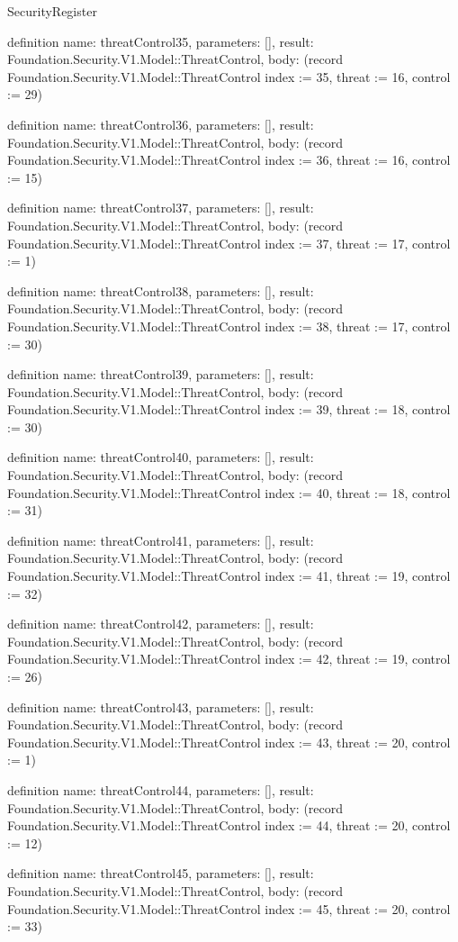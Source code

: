 \begin{lexlean}{SecurityRegister}
\begin{semanticmodule}
definition{
  name: threatControl35,
  parameters: [],
  result: Foundation.Security.V1.Model::ThreatControl,
  body: (record Foundation.Security.V1.Model::ThreatControl {index := 35, threat := 16, control := 29})
}

definition{
  name: threatControl36,
  parameters: [],
  result: Foundation.Security.V1.Model::ThreatControl,
  body: (record Foundation.Security.V1.Model::ThreatControl {index := 36, threat := 16, control := 15})
}

definition{
  name: threatControl37,
  parameters: [],
  result: Foundation.Security.V1.Model::ThreatControl,
  body: (record Foundation.Security.V1.Model::ThreatControl {index := 37, threat := 17, control := 1})
}

definition{
  name: threatControl38,
  parameters: [],
  result: Foundation.Security.V1.Model::ThreatControl,
  body: (record Foundation.Security.V1.Model::ThreatControl {index := 38, threat := 17, control := 30})
}

definition{
  name: threatControl39,
  parameters: [],
  result: Foundation.Security.V1.Model::ThreatControl,
  body: (record Foundation.Security.V1.Model::ThreatControl {index := 39, threat := 18, control := 30})
}

definition{
  name: threatControl40,
  parameters: [],
  result: Foundation.Security.V1.Model::ThreatControl,
  body: (record Foundation.Security.V1.Model::ThreatControl {index := 40, threat := 18, control := 31})
}

definition{
  name: threatControl41,
  parameters: [],
  result: Foundation.Security.V1.Model::ThreatControl,
  body: (record Foundation.Security.V1.Model::ThreatControl {index := 41, threat := 19, control := 32})
}

definition{
  name: threatControl42,
  parameters: [],
  result: Foundation.Security.V1.Model::ThreatControl,
  body: (record Foundation.Security.V1.Model::ThreatControl {index := 42, threat := 19, control := 26})
}

definition{
  name: threatControl43,
  parameters: [],
  result: Foundation.Security.V1.Model::ThreatControl,
  body: (record Foundation.Security.V1.Model::ThreatControl {index := 43, threat := 20, control := 1})
}

definition{
  name: threatControl44,
  parameters: [],
  result: Foundation.Security.V1.Model::ThreatControl,
  body: (record Foundation.Security.V1.Model::ThreatControl {index := 44, threat := 20, control := 12})
}

definition{
  name: threatControl45,
  parameters: [],
  result: Foundation.Security.V1.Model::ThreatControl,
  body: (record Foundation.Security.V1.Model::ThreatControl {index := 45, threat := 20, control := 33})
}


\end{semanticmodule}
\end{lexlean}

